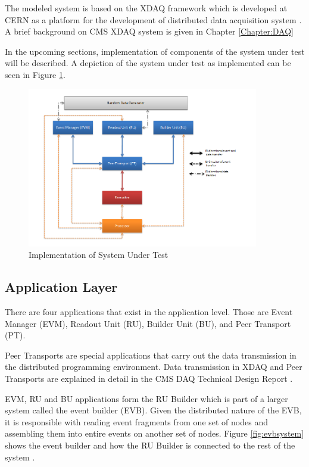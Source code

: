 The modeled system is based on the XDAQ framework which is developed at CERN as a platform for the development of distributed data acquisition system \cite{CMSTDR}. A brief background on CMS XDAQ system is given in Chapter \ref{Chapter:DAQ}

In the upcoming sections, implementation of components of the system under test will be described. A depiction of the system under test as implemented can be seen in Figure \ref{fig:SUT}.

\begin{figure}
	\centering
		\includegraphics[width=0.90\textwidth]{figures/SUT.png}
	\caption{Implementation of System Under Test}
	\label{fig:SUT}
\end{figure}

\subsection{Application Layer}
There are four applications that exist in the application level. Those are Event Manager (EVM), Readout Unit (RU), Builder Unit (BU), and Peer Transport (PT).


Peer Transports are special applications that carry out the data transmission in the distributed programming environment. Data transmission in XDAQ and Peer Transports are explained in detail in the CMS DAQ Technical Design Report \cite{CMSTDR}. 

EVM, RU and BU applications form the RU Builder which is part of a larger system called the event builder (EVB). Given the distributed nature of the EVB, it is responsible with reading event fragments from one set of nodes and assembling them into entire events on another set of nodes. Figure \ref{fig:evbsystem} shows the event builder and how the RU Builder is connected to the rest of the system \cite{ru}. 

